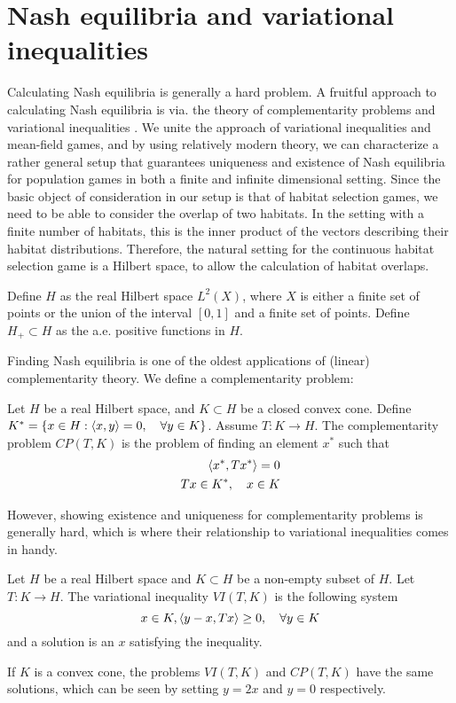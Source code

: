 \section{Nash equilibria and variational inequalities}
Calculating Nash equilibria is generally a hard problem. A fruitful approach to calculating Nash equilibria is via. the theory of complementarity problems and variational inequalities \citep{karamardian1969nonlinear,nabetani2011parametrized}. We unite the approach of variational inequalities and mean-field games, and by using relatively modern theory, we can characterize a rather general setup that guarantees uniqueness and existence of Nash equilibria for population games in both a finite and infinite dimensional setting. Since the basic object of consideration in our setup is that of habitat selection games, we need to be able to consider the overlap of two habitats. In the setting with a finite number of habitats, this is the inner product of the vectors describing their habitat distributions. Therefore, the natural setting for the continuous habitat selection game is a Hilbert space, to allow the calculation of habitat overlaps. 
\begin{definition}
  Define $H$ as the real Hilbert space $L^2(X)$, where $X$ is either a finite set of points or the union of the interval $[0,1]$ and a finite set of points. Define $H_+ \subset H$ as the a.e. positive functions in $H$.
\end{definition}
Finding Nash equilibria is one of the oldest applications of (linear) complementarity theory. We define a complementarity problem:
\begin{definition}
  Let $H$ be a real Hilbert space, and $K \subset H$ be a closed convex cone. Define $K^* = \{ x \in H : \left \langle x,y \right \rangle = 0, \quad \forall y\in K\} $. Assume $T:K \to H$. The complementarity problem $CP(T,K)$ is the problem of finding an element $x^*$ such that
  \begin{equation}
    \begin{split}
    \left \langle x^*,Tx^* \right \rangle = 0 \\
    Tx \in K^*, \quad  x\in K
  \end{split}
  \end{equation}
\end{definition}
However, showing existence and uniqueness for complementarity problems is generally hard, which is where their relationship to variational inequalities comes in handy.
\begin{definition}
  Let $H$ be a real Hilbert space and $K\subset H$ be a non-empty subset of $H$. Let $T: K \to H$. The variational inequality $VI(T,K)$ is the following system
  \begin{equation}
    x \in K, \left \langle y-x,Tx \right \rangle \geq 0, \quad \forall y \in K
  \end{equation}
  and a solution is an $x$ satisfying the inequality.
\end{definition}
If $K$ is a convex cone, the problems $VI(T,K)$ and $CP(T,K)$ have the same solutions, which can be seen by setting $y=2x$ and $y=0$ respectively.

